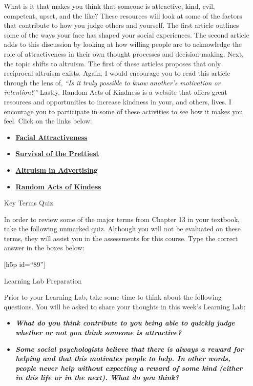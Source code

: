 \documentclass[
]{book}
\providecommand{\tightlist}{%
  \setlength{\itemsep}{0pt}\setlength{\parskip}{0pt}}
\begin{document}
\begin{reflect}
What is it that makes you think that someone is attractive, kind, evil, competent, upset, and the like? These resources will look at some of the factors that contribute to how you judge others and yourself. The first article outlines some of the ways your face has shaped your social experiences. The second article adds to this discussion by looking at how willing people are to acknowledge the role of attractiveness in their own thought processes and decision-making. Next, the topic shifts to altruism. The first of these articles proposes that only reciprocal altruism exists. Again, I would encourage you to read this article through the lens of, \emph{``Is it truly possible to know another's motivation or intention?''} Lastly, Random Acts of Kindness is a website that offers great resources and opportunities to increase kindness in your, and others, lives. I encourage you to participate in some of these activities to see how it makes you feel. Click on the links below:

\begin{itemize}
\tightlist
\item
  \href{https://www.ncbi.nlm.nih.gov/pmc/articles/PMC3130383/}{\textbf{Facial Attractiveness}}\\
\item
  \href{https://www.macleans.ca/society/science/the-mysterious-power-of-attractive-people/}{\textbf{Survival of the Prettiest}}\\
\item
  \href{https://public.wsu.edu/~taflinge/altruism.html}{\textbf{Altruism in Advertising}}\\
\item
  \href{http://www.actsofkindness.org/}{\textbf{Random Acts of Kindess}}
\end{itemize}

{Key Terms Quiz}

In order to review some of the major terms from Chapter 13 in your textbook, take the following unmarked quiz. Although you will not be evaluated on these terms, they will assist you in the assessments for this course. Type the correct answer in the boxes below:

{[}h5p id=``89''{]}

{Learning Lab Preparation}

Prior to your Learning Lab, take some time to think about the following questions. You will be asked to share your thoughts in this week's Learning Lab:

\begin{itemize}
\tightlist
\item
  \textbf{\emph{What do you think contribute to you being able to quickly judge whether or not you think someone is attractive?}}\\
\item
  \textbf{\emph{Some social psychologists believe that there is always a reward for helping and that this motivates people to help. In other words, people never help without expecting a reward of some kind (either in this life or in the next). What do you think?}}
\end{itemize}
\end{reflect}
\end{document}
